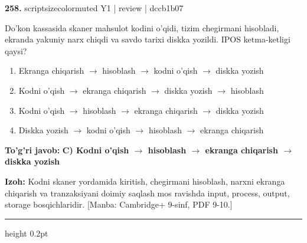\documentclass[10pt,a4paper]{article}
\begin{document}
{\bfseries\sffamily\color{ink} 258.} {scriptsizecolor{muted} Y1 | review | dccb1b07}
\par
Do'kon kassasida skaner mahsulot kodini o'qidi, tizim chegirmani hisobladi, ekranda yakuniy narx chiqdi va savdo tarixi diskka yozildi. IPOS ketma-ketligi qaysi?
\begin{enumerate}[label=\Alph*),leftmargin=9mm]
\item Ekranga chiqarish \ensuremath{\rightarrow} hisoblash \ensuremath{\rightarrow} kodni o'qish \ensuremath{\rightarrow} diskka yozish
\item Kodni o'qish \ensuremath{\rightarrow} ekranga chiqarish \ensuremath{\rightarrow} diskka yozish \ensuremath{\rightarrow} hisoblash
\item Kodni o'qish \ensuremath{\rightarrow} hisoblash \ensuremath{\rightarrow} ekranga chiqarish \ensuremath{\rightarrow} diskka yozish
\item Diskka yozish \ensuremath{\rightarrow} kodni o'qish \ensuremath{\rightarrow} hisoblash \ensuremath{\rightarrow} ekranga chiqarish
\end{enumerate}
\begin{tcolorbox}[enhanced,breakable,colback=teal!4,colframe=teal!60!black,boxrule=0.45pt,arc=1.2mm,left=2.7mm,right=2.7mm,top=1.8mm,bottom=1.8mm,before skip=2mm,after skip=2mm]
{\bfseries\sffamily\color{teal}To'g'ri javob:} \textbf{C) Kodni o'qish \ensuremath{\rightarrow} hisoblash \ensuremath{\rightarrow} ekranga chiqarish \ensuremath{\rightarrow} diskka yozish}
\par\smallskip
{\bfseries Izoh:} Kodni skaner yordamida kiritish, chegirmani hisoblash, narxni ekranga chiqarish va tranzaksiyani doimiy saqlash mos ravishda input, process, output, storage bosqichlaridir. [Manba: Cambridge+ 9-sinf, PDF 9-10.]
\end{tcolorbox}
\vspace{2mm}\hrule height 0.2pt\vspace{3mm}
\end{document}
